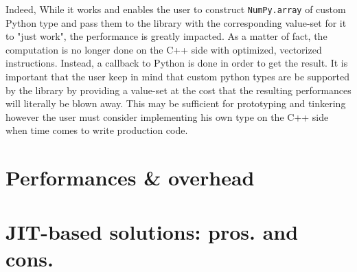 Indeed, While it works and enables the user to construct \texttt{NumPy.array} of custom Python type and pass them to the
library with the corresponding value-set for it to "just work", the performance is greatly impacted. As a matter of
fact, the computation is no longer done on the C++ side with optimized, vectorized instructions. Instead, a callback to
Python is done in order to get the result. It is important that the user keep in mind that custom python types are be
supported by the library by providing a value-set at the cost that the resulting performances will literally be blown
away. This may be sufficient for prototyping and tinkering however the user must consider implementing his own type on
the C++ side when time comes to write production code.

\section{Performances \& overhead}


\section{JIT-based solutions: pros. and cons.}

